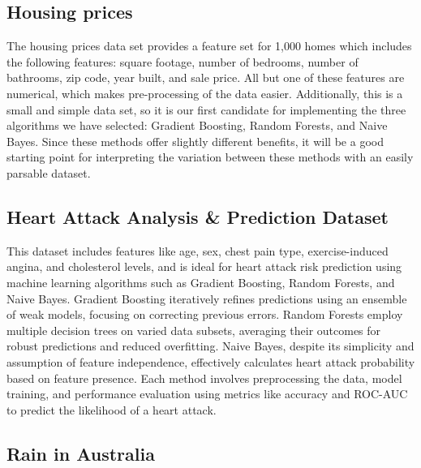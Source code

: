 \documentclass[10pt,twocolumn,letterpaper]{article}
\begin{document}
\subsection{Housing prices \cite{ds1}}

The housing prices data set provides a feature set for 1,000 homes which includes the following features: square footage, number of bedrooms, number of bathrooms, zip code, year built, and sale price.
All but one of these features are numerical, which makes pre-processing of the data easier.
Additionally, this is a small and simple data set, so it is our first candidate for implementing the three algorithms we have selected: Gradient Boosting, Random Forests, and Naive Bayes.
Since these methods offer slightly different benefits, it will be a good starting point for interpreting the variation between these methods with an easily parsable dataset.

\subsection{Heart Attack Analysis \& Prediction Dataset \cite{ds2}}

This dataset includes features like age, sex, chest pain type, exercise-induced angina, and cholesterol levels, and is ideal for heart attack risk prediction using machine learning algorithms such as Gradient Boosting, Random Forests, and Naive Bayes.
Gradient Boosting iteratively refines predictions using an ensemble of weak models, focusing on correcting previous errors.
Random Forests employ multiple decision trees on varied data subsets, averaging their outcomes for robust predictions and reduced overfitting.
Naive Bayes, despite its simplicity and assumption of feature independence, effectively calculates heart attack probability based on feature presence.
Each method involves preprocessing the data, model training, and performance evaluation using metrics like accuracy and ROC-AUC to predict the likelihood of a heart attack.

\subsection{Rain in Australia \cite{ds3}}
\end{document}
